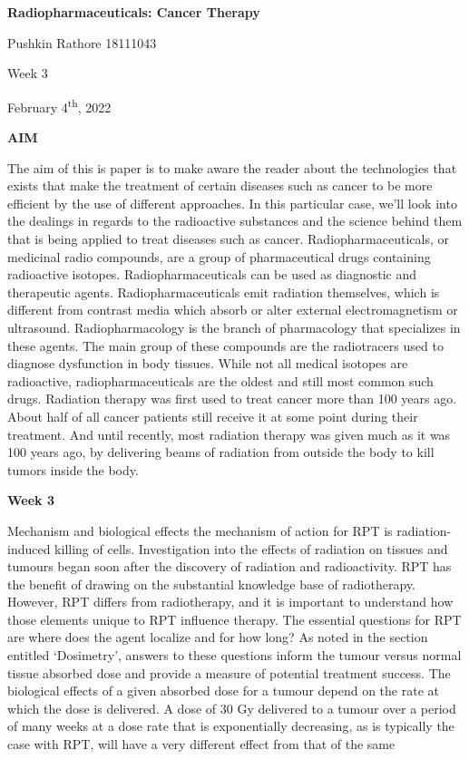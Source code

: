 \documentclass[
]{article}
\author{}
\date{}
\begin{document}
\textbf{{Radiopharmaceuticals: Cancer Therapy}}

Pushkin Rathore 18111043

Week 3

February 4\textsuperscript{th}, 2022

\textbf{AIM}

The aim of this is paper is to make aware the reader about the
technologies that exists that make the treatment of certain diseases
such as cancer to be more efficient by the use of different approaches.
In this particular case, we'll look into the dealings in regards to the
radioactive substances and the science behind them that is being applied
to treat diseases such as cancer. Radiopharmaceuticals, or medicinal
radio compounds, are a group of pharmaceutical drugs containing
radioactive isotopes. Radiopharmaceuticals can be used as diagnostic and
therapeutic agents. Radiopharmaceuticals emit radiation themselves,
which is different from contrast media which absorb or alter external
electromagnetism or ultrasound. Radiopharmacology is the branch of
pharmacology that specializes in these agents. The main group of these
compounds are the radiotracers used to diagnose dysfunction in body
tissues. While not all medical isotopes are radioactive,
radiopharmaceuticals are the oldest and still most common such drugs.
Radiation therapy was first used to treat cancer more than 100 years
ago. About half of all cancer patients still receive it at some point
during their treatment. And until recently, most radiation therapy was
given much as it was 100 years ago, by delivering beams of radiation
from outside the body to kill tumors inside the body.

\textbf{Week 3}

Mechanism and biological effects the mechanism of action for RPT is
radiation- induced killing of cells. Investigation into the effects of
radiation on tissues and tumours began soon after the discovery of
radiation and radioactivity. RPT has the benefit of drawing on the
substantial knowledge base of radiotherapy. However, RPT differs from
radiotherapy, and it is important to understand how those elements
unique to RPT influence therapy. The essential questions for RPT are
where does the agent localize and for how long? As noted in the section
entitled `Dosimetry', answers to these questions inform the tumour
versus normal tissue absorbed dose and provide a measure of potential
treatment success. The biological effects of a given absorbed dose for a
tumour depend on the rate at which the dose is delivered. A dose of 30
Gy delivered to a tumour over a period of many weeks at a dose rate that
is exponentially decreasing, as is typically the case with RPT, will
have a very different effect from that of the same
\end{document}
